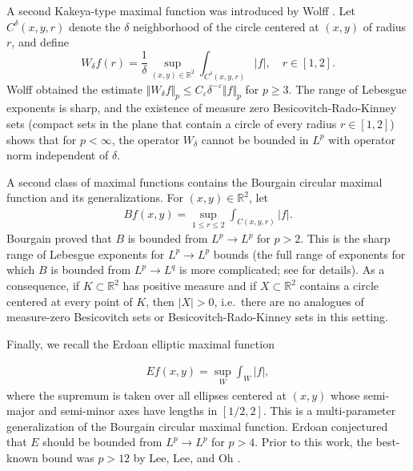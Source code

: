 \documentclass[letterpaper, reqno,11pt]{article}
\numberwithin{equation}{section}
\newcommand{\RR}{\mathbb{R}}
\newcommand{\eps}{\varepsilon}
\numberwithin{thm}{section}
\theoremstyle{remark}
\begin{document}
A second Kakeya-type maximal function was introduced by Wolff \cite{WolffKakeyacircles}. Let $C^\delta(x,y,r)$ denote the $\delta$ neighborhood of the circle centered at $(x,y)$ of radius $r$, and define
\begin{equation}\label{WolffMaximalFn}
W_\delta f (r) = \frac{1}{\delta} \sup_{(x,y)\in\RR^2}\int_{C^\delta(x,y,r)}|f|,\quad r\in [1,2].
\end{equation}
Wolff \cite{WolffKakeyacircles} obtained the estimate $\Vert W_\delta f\Vert_p \leq C_\eps\delta^{-\eps} \Vert f\Vert_{p}$ for $p\geq 3$. The range of Lebesgue exponents is sharp, and the existence of measure zero Besicovitch-Rado-Kinney sets (compact sets in the plane that contain a circle of every radius $r\in[1,2]$) shows that for $p<\infty$, the operator $W_\delta$ cannot be bounded in $L^p$ with operator norm independent of $\delta$.

A second class of maximal functions contains the Bourgain circular maximal function and its generalizations. For $(x,y)\in\RR^2$, let
\begin{equation}\label{bourgainMaxmlFn}
\begin{split}
Bf(x,y) = \sup_{1\leq r\leq 2}\int_{C(x,y,r)}|f|.
\end{split}
\end{equation}
Bourgain \cite{Bour1, Bour2} proved that $B$ is bounded from $L^p\to L^p$ for $p>2$. This is the sharp range of Lebesgue exponents for $L^p\to L^p$ bounds (the full range of exponents for which $B$ is bounded from $L^p\to L^q$ is more complicated; see \cite{Schlag97, Lee03} for details). As a consequence, if $K\subset\RR^2$ has positive measure and if $X\subset\RR^2$ contains a circle centered at every point of $K$, then $|X|>0$, i.e.~there are no analogues of measure-zero Besicovitch sets or Besicovitch-Rado-Kinney sets in this setting. 

Finally, we recall the Erdoan elliptic maximal function

\begin{equation}
\begin{split}
Ef(x,y) = \sup_{W}\int_{W}|f|,
\end{split}
\end{equation}
where the supremum is taken over all ellipses centered at $(x,y)$ whose semi-major and semi-minor axes have lengths in $[1/2, 2]$. 
This is a multi-parameter generalization of the Bourgain circular maximal function. Erdoan \cite{Erd} conjectured that $E$ should be bounded from $L^p\to L^p$ for $p>4$. Prior to this work, the best-known bound was $p>12$ by Lee, Lee, and Oh \cite{LLO}.
\end{document}
